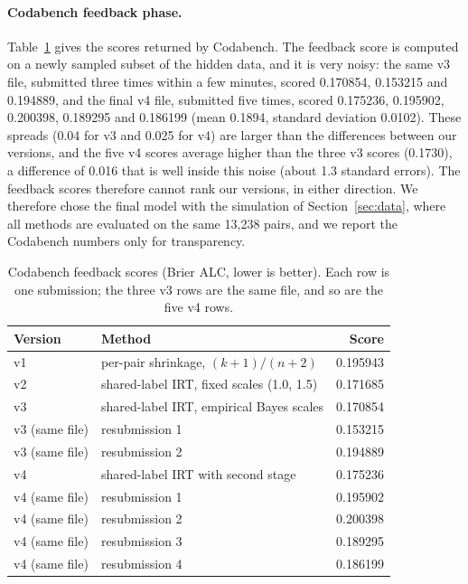 \documentclass{article}
\begin{document}
\paragraph{Codabench feedback phase.} Table~\ref{tab:real} gives the scores returned by Codabench. The feedback score is computed on a newly sampled subset of the hidden data, and it is very noisy: the same v3 file, submitted three times within a few minutes, scored 0.170854, 0.153215 and 0.194889, and the final v4 file, submitted five times, scored 0.175236, 0.195902, 0.200398, 0.189295 and 0.186199 (mean 0.1894, standard deviation 0.0102). These spreads (0.04 for v3 and 0.025 for v4) are larger than the differences between our versions, and the five v4 scores average higher than the three v3 scores (0.1730), a difference of 0.016 that is well inside this noise (about 1.3 standard errors). The feedback scores therefore cannot rank our versions, in either direction. We therefore chose the final model with the simulation of Section~\ref{sec:data}, where all methods are evaluated on the same 13{,}238 pairs, and we report the Codabench numbers only for transparency.

\begin{table}[h]
\centering
\caption{Codabench feedback scores (Brier ALC, lower is better). Each row is one submission; the three v3 rows are the same file, and so are the five v4 rows.}
\label{tab:real}
\begin{tabular}{llr}
\toprule
Version & Method & Score \\
\midrule
v1 & per-pair shrinkage, $(k+1)/(n+2)$ & 0.195943 \\
v2 & shared-label IRT, fixed scales (1.0, 1.5) & 0.171685 \\
v3 & shared-label IRT, empirical Bayes scales & 0.170854 \\
v3 (same file) & resubmission 1 & 0.153215 \\
v3 (same file) & resubmission 2 & 0.194889 \\
v4 & shared-label IRT with second stage & 0.175236 \\
v4 (same file) & resubmission 1 & 0.195902 \\
v4 (same file) & resubmission 2 & 0.200398 \\
v4 (same file) & resubmission 3 & 0.189295 \\
v4 (same file) & resubmission 4 & 0.186199 \\
\bottomrule
\end{tabular}
\end{table}
\end{document}
